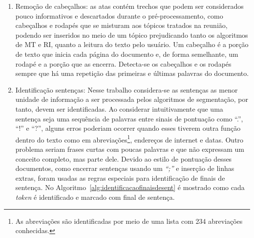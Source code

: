 \begin{enumerate}

\item Remoção de cabeçalhos: as atas contém trechos que podem ser considerados pouco informativos e descartados durante o pré-processamento, como cabeçalhos e rodapés que se misturam aos tópicos tratados na reunião, podendo ser inseridos no meio de um tópico prejudicando tanto os algoritmos de MT e RI, quanto a leitura do texto pelo usuário. Um cabeçalho é a porção de texto que inicia cada página do documento e, de forma semelhante, um rodapé e a porção que as encerra. Detecta-se os cabeçalhos e os rodapés sempre que há uma repetição das primeiras e últimas palavras do documento.


\item Identificação sentenças: Nesse trabalho considera-se as sentenças as menor unidade de informação a ser processada pelos algoritmos de segmentação, por tanto, devem ser identificadas. Ao considerar intuitivamente que uma sentença seja uma sequência de palavras entre sinais de pontuação como ``.'', ``!'' e ``?'', alguns erros poderiam ocorrer quando esses tiverem outra função dentro do texto como em abreviações\footnote{As abreviações são identificadas por meio de uma lista com 234 abreviações conhecidas.}, endereços de internet e datas. Outro problema seriam frases curtas com poucas palavras e que não expressam um conceito completo, mas parte dele. Devido ao estilo de pontuação desses documentos, como encerrar sentenças usando um \textit{``;''} e inserção de linhas extras, foram usadas as regras especiais para identificação de finais de sentença. No Algoritmo~\ref{alg:identificacaofinaisdesent} é mostrado como cada \textit{token} é identificado e marcado com final de sentença.%



\begin{algorithm}

	
	
	 {	

}
\end{algorithm}
\end{enumerate}
